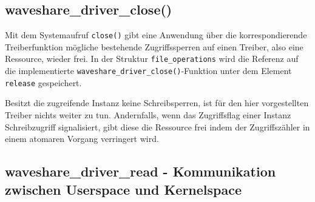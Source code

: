 \subsection{waveshare\_driver\_close()}
Mit dem Systemaufruf \texttt{close()} gibt eine Anwendung über die korrespondierende Treiberfunktion mögliche bestehende Zugriffssperren auf einen Treiber, also eine Ressource, wieder frei. In der Struktur \texttt{file\_operations} wird die Referenz auf die implementierte \texttt{waveshare_driver_close()}-Funktion unter dem Element \texttt{release} gespeichert. 

Besitzt die zugreifende Instanz keine Schreibsperren, ist für den hier vorgestellten Treiber nichts weiter zu tun. Andernfalls, wenn das Zugriffsflag einer Instanz Schreibzugriff signalisiert, gibt diese die Ressource frei indem der Zugriffszähler in einem atomaren Vorgang verringert wird. 




\subsection{waveshare\_driver\_read - Kommunikation zwischen Userspace und Kernelspace}